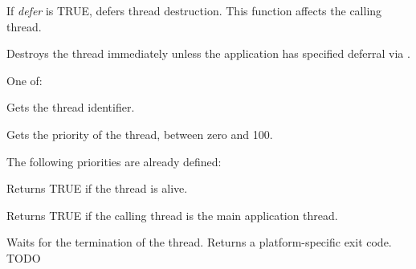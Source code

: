 If {\it defer} is TRUE, defers thread destruction. This function affects the
calling thread.

\label{wxthreaddestroy}


Destroys the thread immediately unless the application has specified deferral via .


One of:

\twocolwidtha{7cm}
\begin{twocollist}\itemsep=0pt
\end{twocollist}

\label{wxthreadgetid}


Gets the thread identifier.

\label{wxthreadgetpriority}


Gets the priority of the thread, between zero and 100.

The following priorities are already defined:

\twocolwidtha{7cm}
\begin{twocollist}\itemsep=0pt
\end{twocollist}

\label{wxthreadisalive}


Returns TRUE if the thread is alive.

\label{wxthreadismain}


Returns TRUE if the calling thread is the main application thread.

\label{wxthreadjoin}


Waits for the termination of the thread. Returns a platform-specific exit code. TODO

